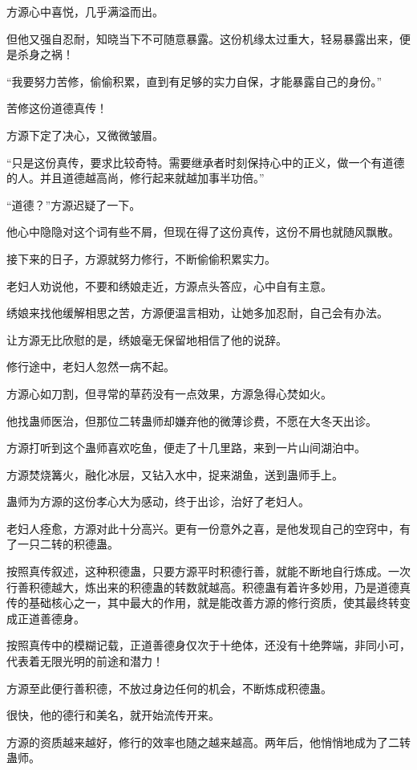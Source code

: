 \begin{this_body}
方源心中喜悦，几乎满溢而出。

但他又强自忍耐，知晓当下不可随意暴露。这份机缘太过重大，轻易暴露出来，便是杀身之祸！

“我要努力苦修，偷偷积累，直到有足够的实力自保，才能暴露自己的身份。”

苦修这份道德真传！

方源下定了决心，又微微皱眉。

“只是这份真传，要求比较奇特。需要继承者时刻保持心中的正义，做一个有道德的人。并且道德越高尚，修行起来就越加事半功倍。”

“道德？”方源迟疑了一下。

他心中隐隐对这个词有些不屑，但现在得了这份真传，这份不屑也就随风飘散。

接下来的日子，方源就努力修行，不断偷偷积累实力。

老妇人劝说他，不要和绣娘走近，方源点头答应，心中自有主意。

绣娘来找他缓解相思之苦，方源便温言相劝，让她多加忍耐，自己会有办法。

让方源无比欣慰的是，绣娘毫无保留地相信了他的说辞。

修行途中，老妇人忽然一病不起。

方源心如刀割，但寻常的草药没有一点效果，方源急得心焚如火。

他找蛊师医治，但那位二转蛊师却嫌弃他的微薄诊费，不愿在大冬天出诊。

方源打听到这个蛊师喜欢吃鱼，便走了十几里路，来到一片山间湖泊中。

方源焚烧篝火，融化冰层，又钻入水中，捉来湖鱼，送到蛊师手上。

蛊师为方源的这份孝心大为感动，终于出诊，治好了老妇人。

老妇人痊愈，方源对此十分高兴。更有一份意外之喜，是他发现自己的空窍中，有了一只二转的积德蛊。

按照真传叙述，这种积德蛊，只要方源平时积德行善，就能不断地自行炼成。一次行善积德越大，炼出来的积德蛊的转数就越高。积德蛊有着许多妙用，乃是道德真传的基础核心之一，其中最大的作用，就是能改善方源的修行资质，使其最终转变成正道善德身。

按照真传中的模糊记载，正道善德身仅次于十绝体，还没有十绝弊端，非同小可，代表着无限光明的前途和潜力！

方源至此便行善积德，不放过身边任何的机会，不断炼成积德蛊。

很快，他的德行和美名，就开始流传开来。

方源的资质越来越好，修行的效率也随之越来越高。两年后，他悄悄地成为了二转蛊师。


\end{this_body}
